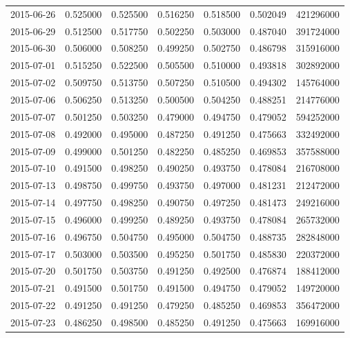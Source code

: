\begin{tabular}{lrrrrrr}
2015-06-26 &    0.525000 &    0.525500 &    0.516250 &    0.518500 &    0.502049 &   421296000 \\
2015-06-29 &    0.512500 &    0.517750 &    0.502250 &    0.503000 &    0.487040 &   391724000 \\
2015-06-30 &    0.506000 &    0.508250 &    0.499250 &    0.502750 &    0.486798 &   315916000 \\
2015-07-01 &    0.515250 &    0.522500 &    0.505500 &    0.510000 &    0.493818 &   302892000 \\
2015-07-02 &    0.509750 &    0.513750 &    0.507250 &    0.510500 &    0.494302 &   145764000 \\
2015-07-06 &    0.506250 &    0.513250 &    0.500500 &    0.504250 &    0.488251 &   214776000 \\
2015-07-07 &    0.501250 &    0.503250 &    0.479000 &    0.494750 &    0.479052 &   594252000 \\
2015-07-08 &    0.492000 &    0.495000 &    0.487250 &    0.491250 &    0.475663 &   332492000 \\
2015-07-09 &    0.499000 &    0.501250 &    0.482250 &    0.485250 &    0.469853 &   357588000 \\
2015-07-10 &    0.491500 &    0.498250 &    0.490250 &    0.493750 &    0.478084 &   216708000 \\
2015-07-13 &    0.498750 &    0.499750 &    0.493750 &    0.497000 &    0.481231 &   212472000 \\
2015-07-14 &    0.497750 &    0.498250 &    0.490750 &    0.497250 &    0.481473 &   249216000 \\
2015-07-15 &    0.496000 &    0.499250 &    0.489250 &    0.493750 &    0.478084 &   265732000 \\
2015-07-16 &    0.496750 &    0.504750 &    0.495000 &    0.504750 &    0.488735 &   282848000 \\
2015-07-17 &    0.503000 &    0.503500 &    0.495250 &    0.501750 &    0.485830 &   220372000 \\
2015-07-20 &    0.501750 &    0.503750 &    0.491250 &    0.492500 &    0.476874 &   188412000 \\
2015-07-21 &    0.491500 &    0.501750 &    0.491500 &    0.494750 &    0.479052 &   149720000 \\
2015-07-22 &    0.491250 &    0.491250 &    0.479250 &    0.485250 &    0.469853 &   356472000 \\
2015-07-23 &    0.486250 &    0.498500 &    0.485250 &    0.491250 &    0.475663 &   169916000 \\

\end{tabular}
